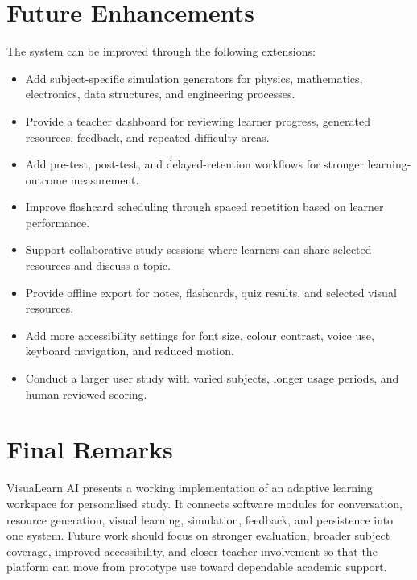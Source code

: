 \section[Future Enhancements]{\textbf{Future Enhancements}}
The system can be improved through the following extensions:
\begin{itemize}[leftmargin=1.2cm]
	\item Add subject-specific simulation generators for physics, mathematics, electronics, data structures, and engineering processes.
	\item Provide a teacher dashboard for reviewing learner progress, generated resources, feedback, and repeated difficulty areas.
	\item Add pre-test, post-test, and delayed-retention workflows for stronger learning-outcome measurement.
	\item Improve flashcard scheduling through spaced repetition based on learner performance.
	\item Support collaborative study sessions where learners can share selected resources and discuss a topic.
	\item Provide offline export for notes, flashcards, quiz results, and selected visual resources.
	\item Add more accessibility settings for font size, colour contrast, voice use, keyboard navigation, and reduced motion.
	\item Conduct a larger user study with varied subjects, longer usage periods, and human-reviewed scoring.
\end{itemize}

\section[Final Remarks]{\textbf{Final Remarks}}
VisuaLearn AI presents a working implementation of an adaptive learning workspace for personalised study. It connects software modules for conversation, resource generation, visual learning, simulation, feedback, and persistence into one system. Future work should focus on stronger evaluation, broader subject coverage, improved accessibility, and closer teacher involvement so that the platform can move from prototype use toward dependable academic support.
